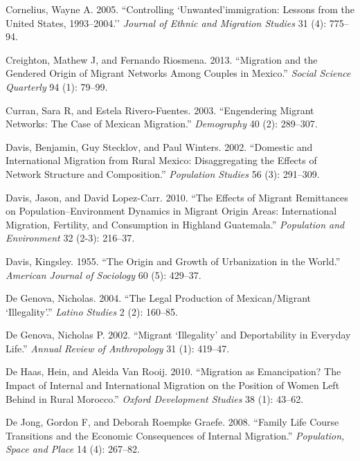\documentclass[
]{article}
\begin{document}
\leavevmode\hypertarget{ref-cornelius2005controlling}{}%
Cornelius, Wayne A. 2005. ``Controlling `Unwanted'immigration: Lessons
from the United States, 1993--2004.'' \emph{Journal of Ethnic and
Migration Studies} 31 (4): 775--94.

\leavevmode\hypertarget{ref-creighton2013migration}{}%
Creighton, Mathew J, and Fernando Riosmena. 2013. ``Migration and the
Gendered Origin of Migrant Networks Among Couples in Mexico.''
\emph{Social Science Quarterly} 94 (1): 79--99.

\leavevmode\hypertarget{ref-curran2003engendering}{}%
Curran, Sara R, and Estela Rivero-Fuentes. 2003. ``Engendering Migrant
Networks: The Case of Mexican Migration.'' \emph{Demography} 40 (2):
289--307.

\leavevmode\hypertarget{ref-davis2002domestic}{}%
Davis, Benjamin, Guy Stecklov, and Paul Winters. 2002. ``Domestic and
International Migration from Rural Mexico: Disaggregating the Effects of
Network Structure and Composition.'' \emph{Population Studies} 56 (3):
291--309.

\leavevmode\hypertarget{ref-davis2010effects}{}%
Davis, Jason, and David Lopez-Carr. 2010. ``The Effects of Migrant
Remittances on Population--Environment Dynamics in Migrant Origin Areas:
International Migration, Fertility, and Consumption in Highland
Guatemala.'' \emph{Population and Environment} 32 (2-3): 216--37.

\leavevmode\hypertarget{ref-davis1955origin}{}%
Davis, Kingsley. 1955. ``The Origin and Growth of Urbanization in the
World.'' \emph{American Journal of Sociology} 60 (5): 429--37.

\leavevmode\hypertarget{ref-de2004legal}{}%
De Genova, Nicholas. 2004. ``The Legal Production of Mexican/Migrant
`Illegality'.'' \emph{Latino Studies} 2 (2): 160--85.

\leavevmode\hypertarget{ref-de2002migrant}{}%
De Genova, Nicholas P. 2002. ``Migrant `Illegality' and Deportability in
Everyday Life.'' \emph{Annual Review of Anthropology} 31 (1): 419--47.

\leavevmode\hypertarget{ref-de2010migration}{}%
De Haas, Hein, and Aleida Van Rooij. 2010. ``Migration as Emancipation?
The Impact of Internal and International Migration on the Position of
Women Left Behind in Rural Morocco.'' \emph{Oxford Development Studies}
38 (1): 43--62.

\leavevmode\hypertarget{ref-de2008family}{}%
De Jong, Gordon F, and Deborah Roempke Graefe. 2008. ``Family Life
Course Transitions and the Economic Consequences of Internal
Migration.'' \emph{Population, Space and Place} 14 (4): 267--82.
\end{document}
